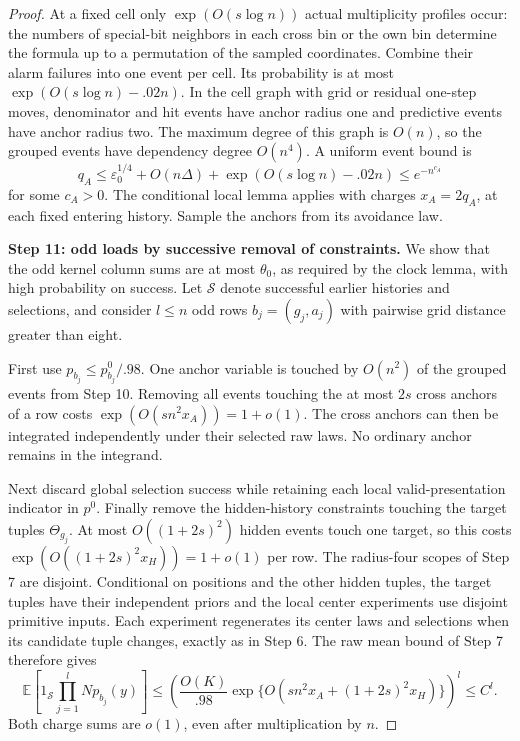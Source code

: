 \begin{proof}
At a fixed cell only \(\exp(O(s\log n))\) actual multiplicity profiles occur: the numbers of special-bit neighbors in each cross bin or the own bin determine the formula up to a permutation of the sampled coordinates. Combine their alarm failures into one event per cell. Its probability is at most \(\exp(O(s\log n)-.02n)\). In the cell graph with grid or residual one-step moves, denominator and hit events have anchor radius one and predictive events have anchor radius two. The maximum degree of this graph is \(O(n)\), so the grouped events have dependency degree \(O(n^4)\). A uniform event bound is
\[
 q_A\le \varepsilon_0^{1/4}+O(n\Delta)
                +\exp(O(s\log n)-.02n)
       \le e^{-n^{c_A}}
\]
for some \(c_A>0\). The conditional local lemma applies with charges \(x_A=2q_A\), at each fixed entering history. Sample the anchors from its avoidance law.

\noindent\textbf{Step 11: odd loads by successive removal of constraints.}\quad
We show that the odd kernel column sums are at most \(\theta_0\), as required by the clock lemma, with high probability on success. Let \(\mathcal S\) denote successful earlier histories and selections, and consider \(l\le n\) odd rows \(b_j=(g_j,a_j)\) with pairwise grid distance greater than eight.

First use \(p_{b_j}\le p^0_{b_j}/.98\). One anchor variable is touched by \(O(n^2)\) of the grouped events from Step 10. Removing all events touching the at most \(2s\) cross anchors of a row costs
\(\exp(O(sn^2x_A))=1+o(1)\).
The cross anchors can then be integrated independently under their selected raw laws. No ordinary anchor remains in the integrand.

Next discard global selection success while retaining each local valid-presentation indicator in \(p^0\). Finally remove the hidden-history constraints touching the target tuples \(\Theta_{g_j}\). At most \(O((1+2s)^2)\) hidden events touch one target, so this costs
\(\exp(O((1+2s)^2x_H))=1+o(1)\) per row.
The radius-four scopes of Step 7 are disjoint. Conditional on positions and the other hidden tuples, the target tuples have their independent priors and the local center experiments use disjoint primitive inputs. Each experiment regenerates its center laws and selections when its candidate tuple changes, exactly as in Step 6. The raw mean bound of Step 7 therefore gives
\[
 \mathbb E\!\left[1_{\mathcal S}
                  \prod_{j=1}^l Np_{b_j}(y)\right]
 \le
 \left(\frac{O(K)}{.98}
  \exp\{O(sn^2x_A+(1+2s)^2x_H)\}\right)^l
 \le C^l.
\]
Both charge sums are \(o(1)\), even after multiplication by \(n\).


\end{proof}
